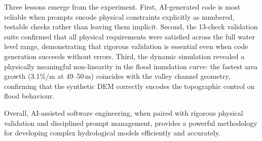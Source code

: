 \documentclass[12pt, a4paper]{article}
\begin{document}
Three lessons emerge from the experiment. First, AI-generated code is most reliable when prompts encode physical constraints explicitly as numbered, testable checks rather than leaving them implicit. Second, the 13-check validation suite confirmed that all physical requirements were satisfied across the full water level range, demonstrating that rigorous validation is essential even when code generation succeeds without errors. Third, the dynamic simulation revealed a physically meaningful non-linearity in the flood inundation curve: the fastest area growth (3.1\%/m at 49--50\,m) coincides with the valley channel geometry, confirming that the synthetic DEM correctly encodes the topographic control on flood behaviour.

Overall, AI-assisted software engineering, when paired with rigorous physical validation and disciplined prompt management, provides a powerful methodology for developing complex hydrological models efficiently and accurately.
\end{document}
